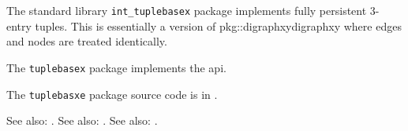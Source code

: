 
The standard library {\tt int\_tuplebasex} package implements fully persistent 3-entry tuples.  This is essentially a version of {pkg::digraphxy}{digraphxy} where edges and nodes are treated identically.

The {\tt tuplebasex} package implements the  api.

The {\tt tuplebasxe} package source code is in .

See also:  .
See also:  .
See also:  .


